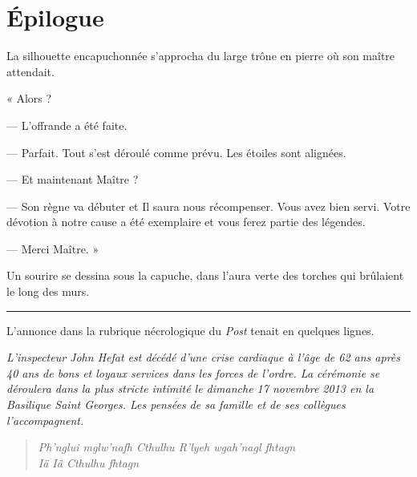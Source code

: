 \chapter[Épilogue]{Épilogue}


La silhouette encapuchonnée s'approcha du large trône en pierre où son maître attendait.

« Alors ?

— L'offrande a été faite.

— Parfait. Tout s'est déroulé comme prévu. Les étoiles sont alignées.

— Et maintenant Maître ?

— Son règne va débuter et Il saura nous récompenser. Vous avez bien servi. Votre dévotion à notre cause a été 
exemplaire et vous ferez partie des légendes.

— Merci Maître. »

Un sourire se dessina sous la capuche, dans l'aura verte des torches qui brûlaient le long des murs.

\fancybreak{$* * *$}

L'annonce dans la rubrique nécrologique du \emph{Post} tenait en quelques lignes.

\emph{L'inspecteur John Hefat est décédé d'une crise cardiaque à l'âge de 62 ans après 40 ans de bons et loyaux 
services dans les forces de l'ordre. La cérémonie se déroulera dans la plus stricte intimité le dimanche 17 novembre 
2013 en la Basilique Saint Georges. Les pensées de sa famille et de ses collègues l'accompagnent.}

\begin{verse}
\emph{Ph’nglui mglw’nafh Cthulhu R’lyeh wgah’nagl fhtagn \\
Iä Iä Cthulhu fhtagn}
\end{verse}